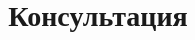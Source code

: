 %
%
\newpage
\title{Консультация}
\begin{listofex}
	\item {}
	\item {}
	\item {}
	\item {}
	\item {}
	\item {}
\end{listofex}